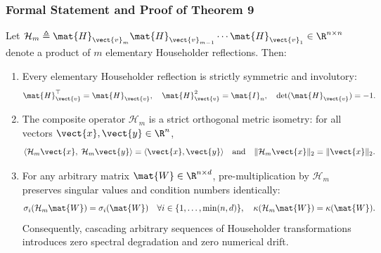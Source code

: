 \subsubsection{Formal Statement and Proof of Theorem 9}

\begin{theorem}
\label{thm:householder_isometry}
Let $\mathcal{H}_m \triangleq \mat{H}_{\vect{v}_m} \mat{H}_{\vect{v}_{m-1}} \cdots \mat{H}_{\vect{v}_1} \in \R^{n \times n}$ denote a product of $m$ elementary Householder reflections. Then:
\begin{enumerate}
    \item Every elementary Householder reflection is strictly symmetric and involutory:
    \begin{equation}
    \mat{H}_{\vect{v}}^\top = \mat{H}_{\vect{v}}, \quad \mat{H}_{\vect{v}}^2 = \mat{I}_n, \quad \det(\mat{H}_{\vect{v}}) = -1.
    \label{eq:thm9_involutory}
    \end{equation}
    \item The composite operator $\mathcal{H}_m$ is a strict orthogonal metric isometry: for all vectors $\vect{x}, \vect{y} \in \R^n$,
    \begin{equation}
    \langle \mathcal{H}_m \vect{x}, \; \mathcal{H}_m \vect{y} \rangle = \langle \vect{x}, \vect{y} \rangle \quad \text{and} \quad \| \mathcal{H}_m \vect{x} \|_2 = \| \vect{x} \|_2.
    \label{eq:thm9_isometry}
    \end{equation}
    \item For any arbitrary matrix $\mat{W} \in \R^{n \times d}$, pre-multiplication by $\mathcal{H}_m$ preserves singular values and condition numbers identically:
    \begin{equation}
    \sigma_i(\mathcal{H}_m \mat{W}) = \sigma_i(\mat{W}) \quad \forall i \in \{1, \dots, \min(n, d)\}, \quad \kappa(\mathcal{H}_m \mat{W}) = \kappa(\mat{W}).
    \label{eq:thm9_condition_number}
    \end{equation}
    Consequently, cascading arbitrary sequences of Householder transformations introduces zero spectral degradation and zero numerical drift.
\end{enumerate}
\end{theorem}

